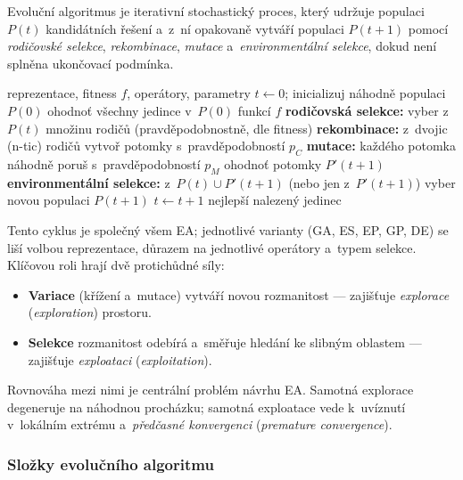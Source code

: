 \documentclass[11pt,a4paper]{article}
\theoremstyle{definition}
\begin{document}
\begin{defbox}
Evoluční algoritmus je iterativní stochastický proces, který udržuje populaci
$P(t)$ kandidátních řešení a~z~ní opakovaně vytváří populaci $P(t+1)$ pomocí
\emph{rodičovské selekce}, \emph{rekombinace}, \emph{mutace} a~\emph{environmentální
selekce}, dokud není splněna ukončovací podmínka.
\end{defbox}

\begin{algorithm}[!ht]
\caption{Obecné schéma evolučního algoritmu}
\begin{algorithmic}[1]
\Require reprezentace, fitness $f$, operátory, parametry
\State $t \gets 0$; inicializuj náhodně populaci $P(0)$
\State ohodnoť všechny jedince v~$P(0)$ funkcí $f$
  \State \textbf{rodičovská selekce:} vyber z~$P(t)$ množinu rodičů (pravděpodobnostně, dle fitness)
  \State \textbf{rekombinace:} z~dvojic (n-tic) rodičů vytvoř potomky s~pravděpodobností $p_C$
  \State \textbf{mutace:} každého potomka náhodně poruš s~pravděpodobností $p_M$
  \State ohodnoť potomky $P'(t+1)$
  \State \textbf{environmentální selekce:} z~$P(t) \cup P'(t+1)$ (nebo jen z~$P'(t+1)$) vyber novou populaci $P(t+1)$
  \State $t \gets t+1$
\EndWhile
\Ensure nejlepší nalezený jedinec
\end{algorithmic}
\end{algorithm}

Tento cyklus je společný všem EA; jednotlivé varianty (GA, ES, EP, GP, DE)
se liší volbou reprezentace, důrazem na jednotlivé operátory a~typem selekce.
Klíčovou roli hrají dvě protichůdné síly:

\begin{itemize}
\item \textbf{Variace} (křížení a~mutace) vytváří novou rozmanitost --- zajišťuje
  \emph{explorace} (\emph{exploration}) prostoru.
\item \textbf{Selekce} rozmanitost odebírá a~směřuje hledání ke slibným
  oblastem --- zajišťuje \emph{exploataci} (\emph{exploitation}).
\end{itemize}

Rovnováha mezi nimi je centrální problém návrhu EA. Samotná explorace degeneruje
na náhodnou procházku; samotná exploatace vede k~uvíznutí v~lokálním extrému
a~\emph{předčasné konvergenci} (\emph{premature convergence}).

\subsubsection{Složky evolučního algoritmu}
\end{document}
